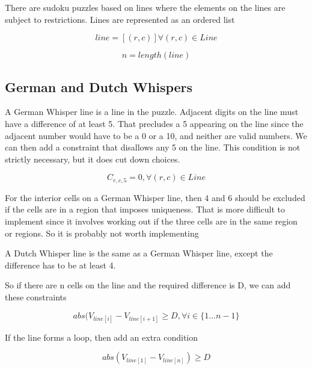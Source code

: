 \documentclass{article}
\begin{document}
There are sudoku puzzles based on lines where the elements on the lines are subject to restrictions.  Lines are represented as an ordered list

\begin{equation}
line = [(r,c)] \forall (r,c) \in Line
\end{equation}

\begin{equation}
n = length(line)
\end{equation}


\subsection{German and Dutch Whispers}

A German Whisper line is a line in the puzzle. Adjacent digits on the line must have a difference of at least 5. 
That precludes a 5 appearing on the line since the adjacent number would have to be a 0 or a 10, and neither are valid numbers.
We can then add a constraint that disallows any 5 on the line. This condition is not strictly necessary, but it does cut down choices.

\begin{equation}
C_{r,c,5} = 0, \forall (r,c) \in Line
\end{equation}

For the interior cells on a German Whisper line, then 4 and 6 should be excluded if the cells are in a region that 
imposes uniqueness.  That is more difficult to implement since it involves working out if the three cells are in the same region or regions. 
So it is probably not worth implementing

A Dutch Whisper line is the same as a German Whisper line, except the difference has to be at least 4.

So if there are n cells on the line and the required difference is D, we can add these constraints

\begin{equation}
abs (V_{line[i]} - V_{line[i+1]} \geq D, \forall i \in \lbrace 1 ... n-1 \rbrace
\end{equation}

If the line forms a loop, then add an extra condition

\begin{equation}
abs (V_{line[1]} - V_{line[n]}) \geq D
\end{equation}
\end{document}
